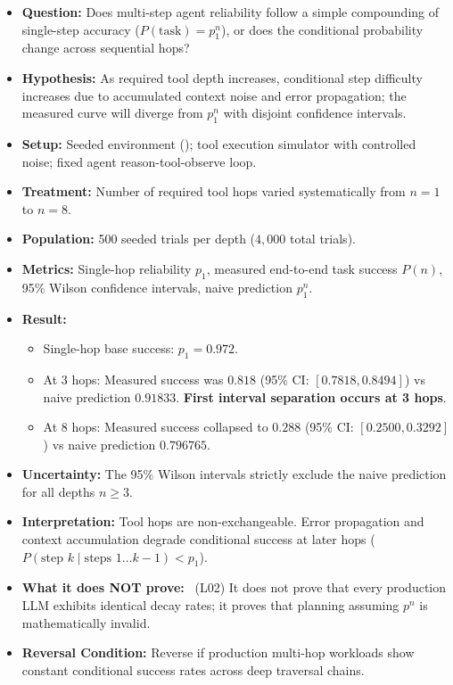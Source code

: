 \begingroup
\small
\begin{itemize}\setlength{\itemsep}{1.2pt}\setlength{\parsep}{0pt}\setlength{\parskip}{0pt}
    \item \textbf{Question:} Does multi-step agent reliability follow a simple compounding of single-step accuracy ($P(\text{task}) = p_1^n$), or does the conditional probability change across sequential hops?
    \item \textbf{Hypothesis:} As required tool depth increases, conditional step difficulty increases due to accumulated context noise and error propagation; the measured curve will diverge from $p_1^n$ with disjoint confidence intervals.
    \item \textbf{Setup:} Seeded environment (); tool execution simulator with controlled noise; fixed agent reason-tool-observe loop.
    \item \textbf{Treatment:} Number of required tool hops varied systematically from $n=1$ to $n=8$.
    \item \textbf{Population:} 500 seeded trials per depth ($4,000$ total trials).
    \item \textbf{Metrics:} Single-hop reliability $p_1$, measured end-to-end task success $P(n)$, 95\% Wilson confidence intervals, naive prediction $p_1^n$.
    \item \textbf{Result:} \MEASURED
    \begin{itemize}\setlength{\itemsep}{0.8pt}\setlength{\parsep}{0pt}
        \item Single-hop base success: $p_1 = \mathbf{0.972}$.
        \item At 3 hops: Measured success was $\mathbf{0.818}$ (95\% CI: $[0.7818, 0.8494]$) vs naive prediction $\mathbf{0.91833}$. \textbf{First interval separation occurs at 3 hops}.
        \item At 8 hops: Measured success collapsed to $\mathbf{0.288}$ (95\% CI: $[0.2500, 0.3292]$) vs naive prediction $\mathbf{0.796765}$.
    \end{itemize}
    \item \textbf{Uncertainty:} The 95\% Wilson intervals strictly exclude the naive prediction for all depths $n \ge 3$.
    \item \textbf{Interpretation:} Tool hops are non-exchangeable. Error propagation and context accumulation degrade conditional success at later hops ($P(\text{step } k \mid \text{steps } 1 \dots k-1) < p_1$).
    \item \textbf{What it does NOT prove:} \LIMITATION\ (L02) It does not prove that every production LLM exhibits identical decay rates; it proves that planning assuming $p^n$ is mathematically invalid.
    \item \textbf{Reversal Condition:} Reverse if production multi-hop workloads show constant conditional success rates across deep traversal chains.
\end{itemize}
\endgroup

